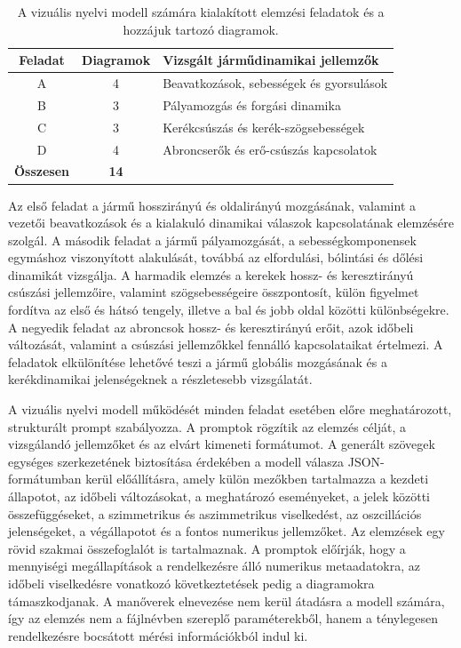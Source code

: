 \documentclass[12pt,a4paper,onehalfspacing, oneside]{book} %
\begin{document}
\begin{table}[htb!]
\centering
\small
\begin{tabular}{ccl}
\hline
\textbf{Feladat} & \textbf{Diagramok} & \textbf{Vizsgált járműdinamikai jellemzők} \\ \hline \hline
A & 4 & Beavatkozások, sebességek és gyorsulások \\
B & 3 & Pályamozgás és forgási dinamika \\
C & 3 & Kerékcsúszás és kerék-szögsebességek \\
D & 4 & Abroncserők és erő-csúszás kapcsolatok \\ \hline
\multicolumn{1}{r}{\textbf{Összesen}} & \textbf{14} & \\ \hline
\end{tabular}
\caption{A vizuális nyelvi modell számára kialakított elemzési feladatok és a hozzájuk tartozó diagramok.}
\label{tab:vlm_feladatok}
\end{table}

Az első feladat a jármű hosszirányú és oldalirányú mozgásának, valamint a vezetői beavatkozások és a kialakuló dinamikai válaszok kapcsolatának elemzésére szolgál. A második feladat a jármű pályamozgását, a sebességkomponensek egymáshoz viszonyított alakulását, továbbá az elfordulási, bólintási és dőlési dinamikát vizsgálja. A harmadik elemzés a kerekek hossz- és keresztirányú csúszási jellemzőire, valamint szögsebességeire összpontosít, külön figyelmet fordítva az első és hátsó tengely, illetve a bal és jobb oldal közötti különbségekre. A negyedik feladat az abroncsok hossz- és keresztirányú erőit, azok időbeli változását, valamint a csúszási jellemzőkkel fennálló kapcsolataikat értelmezi. A feladatok elkülönítése lehetővé teszi a jármű globális mozgásának és a kerékdinamikai jelenségeknek a részletesebb vizsgálatát.

A vizuális nyelvi modell működését minden feladat esetében előre meghatározott, strukturált prompt szabályozza. A promptok rögzítik az elemzés célját, a vizsgálandó jellemzőket és az elvárt kimeneti formátumot. A generált szövegek egységes szerkezetének biztosítása érdekében a modell válasza JSON-formátumban kerül előállításra, amely külön mezőkben tartalmazza a kezdeti állapotot, az időbeli változásokat, a meghatározó eseményeket, a jelek közötti összefüggéseket, a szimmetrikus és aszimmetrikus viselkedést, az oszcillációs jelenségeket, a végállapotot és a fontos numerikus jellemzőket. Az elemzések egy rövid szakmai összefoglalót is tartalmaznak. A promptok előírják, hogy a mennyiségi megállapítások a rendelkezésre álló numerikus metaadatokra, az időbeli viselkedésre vonatkozó következtetések pedig a diagramokra támaszkodjanak. A manőverek elnevezése nem kerül átadásra a modell számára, így az elemzés nem a fájlnévben szereplő paraméterekből, hanem a ténylegesen rendelkezésre bocsátott mérési információkból indul ki.
\end{document}
